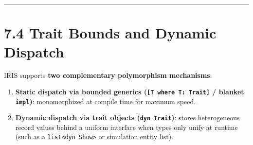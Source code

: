 \documentclass[
  english,
  oneside]{book}
\providecommand{\tightlist}{%
  \setlength{\itemsep}{0pt}\setlength{\parskip}{0pt}}
\begin{document}
\begin{center}\rule{0.5\linewidth}{0.5pt}\end{center}

\section{7.4 Trait Bounds and Dynamic
Dispatch}\label{trait-bounds-and-dynamic-dispatch}

IRIS supports \textbf{two complementary polymorphism mechanisms}:

\begin{enumerate}
\def\labelenumi{\arabic{enumi}.}
\tightlist
\item
  \textbf{Static dispatch via bounded generics
  (\texttt{{[}T\ where\ T:\ Trait{]}} / blanket \texttt{impl})}:
  monomorphized at compile time for maximum speed.
\item
  \textbf{Dynamic dispatch via trait objects (\texttt{dyn\ Trait})}:
  stores heterogeneous record values behind a uniform interface when
  types only unify at runtime (such as a
  \texttt{list\textless{}dyn\ Show\textgreater{}} or simulation entity
  list).
\end{enumerate}
\end{document}

